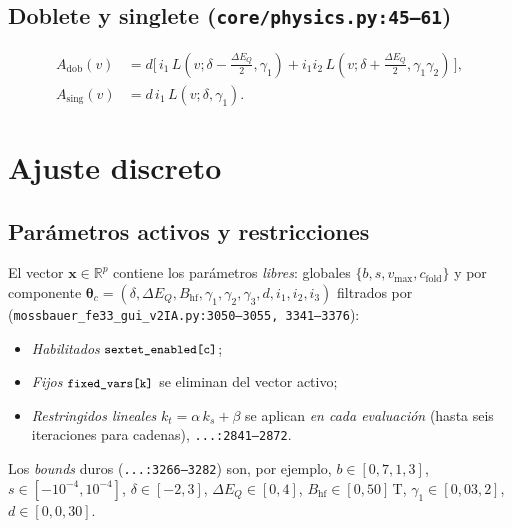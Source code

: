 \documentclass[11pt,a4paper]{article}
\newcommand{\BHF}{B_{\mathrm{hf}}}
\newcommand{\dEQ}{\Delta E_{Q}}
\newcommand{\code}[1]{\texttt{\small #1}}
\newcommand{\file}[1]{\textcolor{black!70}{\texttt{\small #1}}}
\begin{document}
\subsection{Doblete y singlete (\file{core/physics.py:45--61})}
\begin{align}
  A_{\text{dob}}(v) &= d\bigl[\,i_1\,L(v;\delta-\tfrac{\dEQ}{2},\gamma_1) + i_1 i_2\,L(v;\delta+\tfrac{\dEQ}{2},\gamma_1\gamma_2)\,\bigr],\\
  A_{\text{sing}}(v) &= d\,i_1\,L(v;\delta,\gamma_1).
\end{align}

\section{Ajuste discreto}\label{sec:disc}

\subsection{Parámetros activos y restricciones}\label{sec:active}
El vector $\bm x \in \mathbb R^{p}$ contiene los parámetros \emph{libres}: globales $\{b,s,v_{\max},c_{\text{fold}}\}$ y por componente $\bm\theta_c=(\delta,\dEQ,\BHF,\gamma_1,\gamma_2,\gamma_3,d,i_1,i_2,i_3)$ filtrados por (\file{mossbauer\_fe33\_gui\_v2IA.py:3050--3055, 3341--3376}):
\begin{itemize}[leftmargin=*]
  \item \emph{Habilitados} $\code{sextet\_enabled[c]}$;
  \item \emph{Fijos} $\code{fixed\_vars[k]}$ se eliminan del vector activo;
  \item \emph{Restringidos lineales} $k_t = \alpha\, k_s + \beta$ se aplican \emph{en cada evaluación} (hasta seis iteraciones para cadenas), \file{...:2841--2872}.
\end{itemize}
Los \emph{bounds} duros (\file{...:3266--3282}) son, por ejemplo,
$b\in[0{,}7,1{,}3]$, $s\in[-10^{-4},10^{-4}]$, $\delta\in[-2,3]$, $\dEQ\in[0,4]$, $\BHF\in[0,50]\,$T, $\gamma_1\in[0{,}03,2]$, $d\in[0,0{,}30]$.
\end{document}

